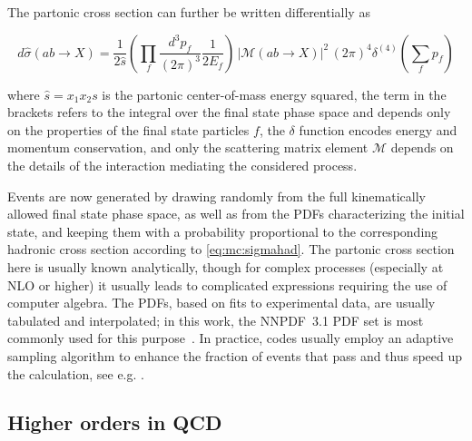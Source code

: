 
The partonic cross section can further be written differentially as~\cite{Peskin:1995ev}

\begin{equation}
    d \hat{\sigma} (a b \rightarrow X) = \frac{1}{2 \hat{s}} \left( \prod_f \frac{d^3 p_f}{(2\pi)^3} \frac{1}{2 E_f} \right) \, \left| \mathcal{M} (a b \rightarrow 
    X ) \right|^2 \, (2\pi)^4 \delta^{(4)} \left( \sum_f p_f \right)
\end{equation}

\noindent where $\hat{s} = x_1 x_2 s$ is the partonic center-of-mass energy squared, the term in the brackets refers to the integral over the final state phase space and depends only on the properties of the final state particles $f$, the $\delta$ function encodes energy and momentum conservation, and only the scattering matrix element $\mathcal{M}$ depends on the details of the interaction mediating the considered process.

Events are now generated by drawing randomly from the full kinematically allowed final state phase space, as well as from the PDFs characterizing the initial state, and keeping them with a probability proportional to the corresponding hadronic cross section according to \cref{eq:mc:sigmahad}. The partonic cross section here is usually known analytically, though for complex processes (especially at NLO or higher) it usually leads to complicated expressions requiring the use of computer algebra. The PDFs, based on fits to experimental data, are usually tabulated and interpolated; in this work, the NNPDF~3.1 PDF set is most commonly used for this purpose~\cite{NNPDF:2017mvq}. In practice, codes usually employ an adaptive sampling algorithm to enhance the fraction of events that pass and thus speed up the calculation, see e.g. .

\subsection{Higher orders in QCD}

